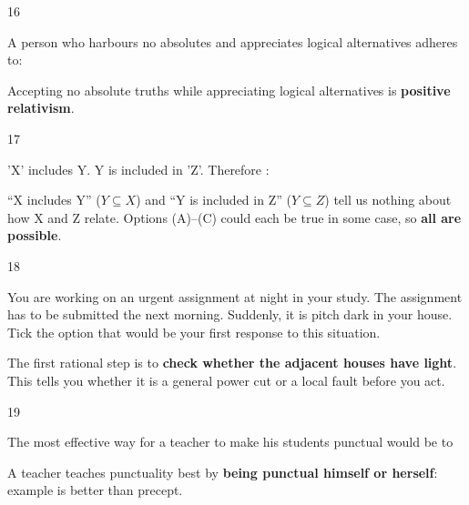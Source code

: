 \begin{question}{16}
{A person who harbours no absolutes and appreciates logical alternatives adheres to:\par}
\begin{explain}
Accepting no absolute truths while appreciating logical alternatives is \textbf{positive relativism}.
\end{explain}
\end{question}

\begin{question}{17}
{'X' includes Y. Y is included in 'Z'. Therefore :\par}
\begin{explain}
``X includes Y'' ($Y\subseteq X$) and ``Y is included in Z'' ($Y\subseteq Z$) tell us nothing about how X and Z relate. Options (A)--(C) could each be true in some case, so \textbf{all are possible}.
\end{explain}
\end{question}

\begin{question}{18}
{You are working on an urgent assignment at night in your study. The assignment has to be submitted the next morning. Suddenly, it is pitch dark in your house. Tick the option that would be your first response to this situation.\par}
\begin{explain}
The first rational step is to \textbf{check whether the adjacent houses have light}. This tells you whether it is a general power cut or a local fault before you act.
\end{explain}
\end{question}

\begin{question}{19}
{The most effective way for a teacher to make his students punctual would be to\par}
\begin{explain}
A teacher teaches punctuality best by \textbf{being punctual himself or herself}: example is better than precept.
\end{explain}
\end{question}

